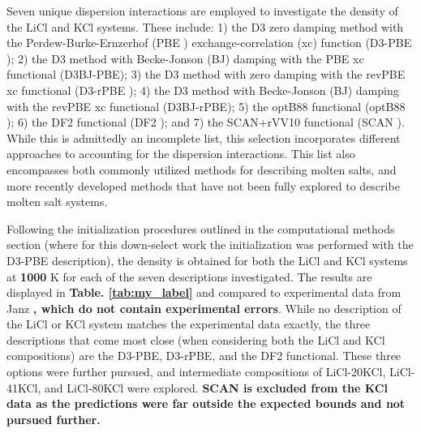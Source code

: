 \documentclass[review]{elsarticle}
\providecommand{\DIFaddtex}[1]{{\bf #1}} %
\providecommand{\DIFdeltex}[1]{} %
\providecommand{\DIFaddbegin}{\protect\color{blue}} %
\providecommand{\DIFaddend}{\protect\color{black}} %
\providecommand{\DIFdelbegin}{\protect\color{red}} %
\providecommand{\DIFdelend}{\protect\color{black}} %
\providecommand{\DIFadd}[1]{\texorpdfstring{\DIFaddtex{#1}}{#1}} %
\providecommand{\DIFdel}[1]{\texorpdfstring{\DIFdeltex{#1}}{}} %
\newcommand{\DIFscaledelfig}{0.5}
\newlength{\DIFdelgraphicswidth} %
\newlength{\DIFdelgraphicsheight} %
\newcommand{\DIFaddincludegraphics}[2][]{{\color{blue}\fbox{\DIFOincludegraphics[#1]{#2}}}} %
\newcommand{\DIFdelincludegraphics}[2][]{%
\sbox{\DIFdelgraphicsbox}{\DIFOincludegraphics[#1]{#2}}%
\settoboxwidth{\DIFdelgraphicswidth}{\DIFdelgraphicsbox} %
\settoboxtotalheight{\DIFdelgraphicsheight}{\DIFdelgraphicsbox} %
\scalebox{\DIFscaledelfig}{%
\parbox[b]{\DIFdelgraphicswidth}{\usebox{\DIFdelgraphicsbox}\\[-\baselineskip] \rule{\DIFdelgraphicswidth}{0em}}\llap{\resizebox{\DIFdelgraphicswidth}{\DIFdelgraphicsheight}{%
\setlength{\unitlength}{\DIFdelgraphicswidth}%
\begin{picture}(1,1)%
\thicklines\linethickness{2pt} %
{\color[rgb]{1,0,0}\put(0,0){\framebox(1,1){}}}%
{\color[rgb]{1,0,0}\put(0,0){\line( 1,1){1}}}%
{\color[rgb]{1,0,0}\put(0,1){\line(1,-1){1}}}%
\end{picture}%
}\hspace*{3pt}}} %
} %
\DeclareRobustCommand{\DIFaddbegin}{\DIFOaddbegin \let\includegraphics\DIFaddincludegraphics} %
\DeclareRobustCommand{\DIFaddend}{\DIFOaddend \let\includegraphics\DIFOincludegraphics} %
\DeclareRobustCommand{\DIFdelbegin}{\DIFOdelbegin \let\includegraphics\DIFdelincludegraphics} %
\DeclareRobustCommand{\DIFdelend}{\DIFOaddend \let\includegraphics\DIFOincludegraphics} %
\begin{document}
Seven unique dispersion interactions are employed to investigate the density of the LiCl and KCl systems. These include: 1) the D3 zero damping method with the Perdew-Burke-Ernzerhof (PBE \cite{perdew1996}) exchange-correlation (xc) function (D3-PBE \cite{Grimme2010}); 2) the D3 method with Becke-Jonson (BJ) damping with the PBE xc functional (D3BJ-PBE); 3) the D3 method with zero damping with the revPBE xc functional (D3-rPBE \cite{zhang1998}); 4) the D3 method with Becke-Jonson (BJ) damping with the revPBE xc functional (D3BJ-rPBE); 5) the optB88 functional (optB88 \cite{klimevs2009chemical}); 6) the DF2 functional (DF2 \cite{lee2010}); and 7) the SCAN+rVV10 functional (SCAN \cite{peng2016}). While this is admittedly an incomplete list, this selection incorporates different approaches to accounting for the dispersion interactions. This list also encompasses both commonly utilized methods for describing molten salts, and more recently developed methods that have not been fully explored to describe molten salt systems. 

Following the initialization procedures outlined in the computational methods section (where for this down-select work the initialization was performed with the D3-PBE description), the density \DIFdelbegin \DIFdel{as a function of pressure }\DIFdelend is obtained for both the LiCl and KCl systems at \DIFdelbegin \DIFdel{1100 }\DIFdelend \DIFaddbegin \DIFadd{1000 }\DIFaddend K for each of the seven descriptions investigated. The results are displayed in \DIFdelbegin \DIFdel{Fig. \ref{fig:disp} }\DIFdelend \DIFaddbegin \DIFadd{Table. \ref{tab:my_label} }\DIFaddend and compared to experimental data from Janz \DIFdelbegin \DIFdel{\cite{Janz1988}}\DIFdelend \DIFaddbegin \DIFadd{\cite{janz1975molten,van1955electrical}, which do not contain experimental errors}\DIFaddend . While no description of the LiCl or KCl system matches the experimental data exactly, the three descriptions that come most close (when considering both the LiCl and KCl compositions) are the D3-PBE, D3-rPBE, and the DF2 functional. These three options were further pursued, and intermediate compositions of LiCl-20KCl, LiCl-41KCl, and LiCl-80KCl were explored. \DIFaddbegin \DIFadd{SCAN is excluded from the KCl data as the predictions were far outside the expected bounds and not pursued further.
 }\DIFaddend 
\end{document}
